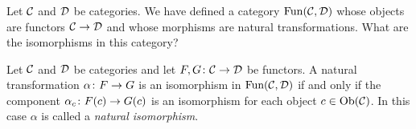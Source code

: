 \documentclass[CT4S-EN-RU]{subfiles}
\begin{document}
\subsubsection{}

\begin{blockENG}
Let $\mathcal{C}$ and $\mathcal{D}$ be categories. We have defined a category $\textnormal{Fun}(\mathcal{C},\mathcal{D})$ whose objects are functors $\mathcal{C}\rightarrow\mathcal{D}$ and whose morphisms are natural transformations. What are the isomorphisms in this category? 
\end{blockENG}

\begin{blockRUS}
\end{blockRUS}

\begin{lemmaENG}\label{lemma:natural iso}
Let $\mathcal{C}$ and $\mathcal{D}$ be categories and let $F,G\colon\mathcal{C}\rightarrow\mathcal{D}$ be functors. A natural transformation $\alpha\colon F\rightarrow G$ is an isomorphism in $\textnormal{Fun}(\mathcal{C},\mathcal{D})$ if and only if the component $\alpha_c\colon F(c)\rightarrow G(c)$ is an isomorphism for each object $c\in\textnormal{Ob}(\mathcal{C})$. In this case $\alpha$ is called a {\em natural isomorphism}.
\end{lemmaENG}

\begin{lemmaRUS}\label{lemma:natural iso}
\end{lemmaRUS}
\end{document}
